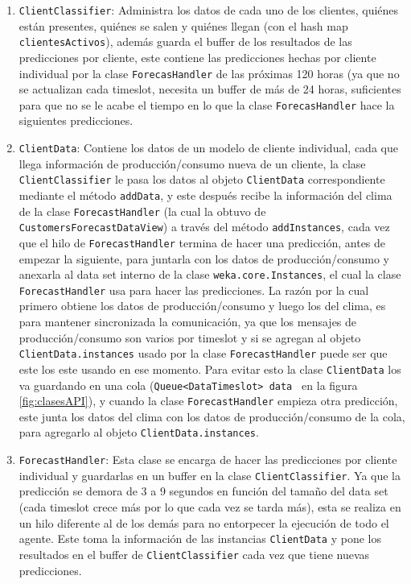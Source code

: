 \renewcommand{\labelenumi}{$\bullet$ }
\begin{enumerate}
	\item \texttt{ClientClassifier}: Administra los datos de cada uno de los clientes, quiénes están presentes, quiénes se salen y quiénes llegan (con el hash map \texttt{clientesActivos}), además guarda el buffer de los resultados de las predicciones por cliente, este contiene las predicciones hechas por cliente individual por la clase \texttt{ForecasHandler} de las próximas 120 horas (ya que no se actualizan cada timeslot, necesita un buffer de más de 24 horas, suficientes para que no se le acabe el tiempo en lo que la clase \texttt{ForecasHandler} hace la siguientes predicciones.
	
	\item \texttt{ClientData}: Contiene los datos de un modelo de cliente individual, cada que llega información de producción/consumo nueva de un cliente, la clase \texttt{ClientClassifier} le pasa los datos al objeto \texttt{ClientData} correspondiente mediante el método \texttt{addData}, y este después recibe la información del clima de la clase \texttt{ForecastHandler} (la cual la obtuvo de \texttt{CustomersForecastDataView}) a través del método \texttt{addInstances}, cada vez que el hilo de \texttt{ForecastHandler} termina de hacer una predicción, antes de empezar la siguiente, para juntarla con los datos de producción/consumo y anexarla al data set interno de la clase \texttt{weka.core.Instances}, el cual la clase \texttt{ForecastHandler} usa para hacer las predicciones.
La razón por la cual primero obtiene los datos de producción/consumo y luego los del clima, es para mantener sincronizada la comunicación, ya que los mensajes de producción/consumo son varios por timeslot y si se agregan al objeto \texttt{ClientData.instances} usado por la clase \texttt{ForecastHandler} puede ser que este los este usando en ese momento. Para evitar esto la clase \texttt{ClientData} los va guardando en una cola ({\tt\lstinline$Queue<DataTimeslot> data$ }  en la figura \ref{fig:clasesAPI}), y cuando la clase \texttt{ForecastHandler} empieza otra predicción, este junta los datos del clima con los datos de producción/consumo de la cola, para agregarlo al objeto \texttt{ClientData.instances}.
	
	\item \texttt{ForecastHandler}: Esta clase se encarga de hacer las predicciones por cliente individual y guardarlas en un buffer en la clase \texttt{ClientClassifier}. Ya que la predicción se demora de 3 a 9 segundos en función del tamaño del data set (cada timeslot crece más por lo que cada vez se tarda más), esta se realiza en un hilo diferente al de los demás para no entorpecer la ejecución de todo el agente. Este toma la información de las instancias \texttt{ClientData} y pone los resultados en el buffer de \texttt{ClientClassifier} cada vez que tiene nuevas predicciones.
	

\end{enumerate}
